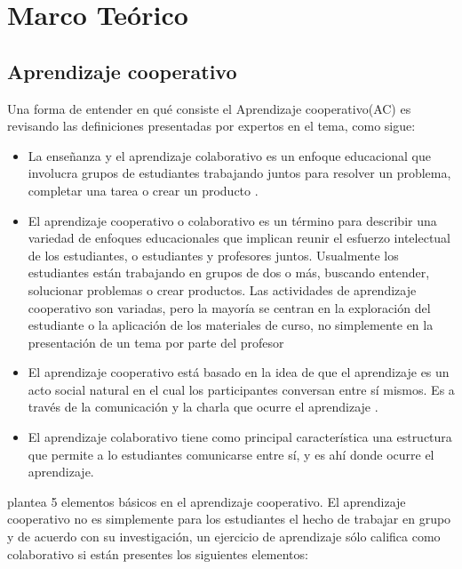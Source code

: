 \chapter{Marco Teórico}
\section{Aprendizaje cooperativo}
Una forma de entender en qué consiste el Aprendizaje cooperativo(AC) es revisando las definiciones presentadas por expertos en el tema, como sigue:
\begin{itemize}
  \item La enseñanza y el aprendizaje colaborativo es un enfoque educacional que involucra grupos de estudiantes trabajando juntos para resolver un problema, completar una tarea o crear un producto \cite{macgregor_collaborative_1990}.
  \item El aprendizaje cooperativo o colaborativo es un término para describir una variedad de enfoques educacionales que implican reunir el esfuerzo intelectual de los estudiantes, o estudiantes y profesores juntos. Usualmente los estudiantes están trabajando en grupos de dos o más, buscando entender, solucionar problemas o crear productos. Las actividades de aprendizaje cooperativo son variadas, pero la mayoría se centran en la exploración del estudiante o la aplicación de los materiales de curso, no simplemente en la presentación de un tema por parte del profesor \cite{smith_collaborative_1992}
  \item El aprendizaje cooperativo está basado en la idea de que el aprendizaje es un acto social natural en el cual los participantes conversan entre sí mismos. Es a través de la comunicación y la charla que ocurre el aprendizaje \cite{gerlach_1994}.
  \item El aprendizaje colaborativo tiene como principal característica una estructura que permite a lo estudiantes comunicarse entre sí, y es ahí donde ocurre el aprendizaje\cite{golub1988focus}.

\end{itemize}

\cite{johnson_1984} plantea 5 elementos básicos en el aprendizaje cooperativo. El aprendizaje cooperativo no es simplemente para los estudiantes el hecho de trabajar en grupo y de acuerdo con su investigación,  un ejercicio de aprendizaje sólo califica como colaborativo si están presentes los siguientes elementos:

